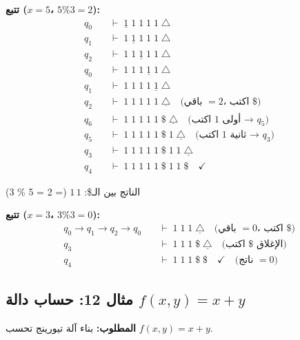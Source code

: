 \documentclass[14pt]{extarticle}
\begin{document}
\textbf{تتبع ($x = 5$، $5 \% 3 = 2$):}
\begin{align*}
q_0 \quad &\vdash \; \underline{1} \; 1 \; 1 \; 1 \; 1 \; \triangle \\
q_1 \quad &\vdash \; 1 \; \underline{1} \; 1 \; 1 \; 1 \; \triangle \\
q_2 \quad &\vdash \; 1 \; 1 \; \underline{1} \; 1 \; 1 \; \triangle \\
q_0 \quad &\vdash \; 1 \; 1 \; 1 \; \underline{1} \; 1 \; \triangle \\
q_1 \quad &\vdash \; 1 \; 1 \; 1 \; 1 \; \underline{1} \; \triangle \\
q_2 \quad &\vdash \; 1 \; 1 \; 1 \; 1 \; 1 \; \underline{\triangle} \quad \text{(باقي $= 2$، اكتب $\$$)} \\
q_6 \quad &\vdash \; 1 \; 1 \; 1 \; 1 \; 1 \; \$ \; \underline{\triangle} \quad \text{(اكتب $1$ أولى → $q_5$)} \\
q_5 \quad &\vdash \; 1 \; 1 \; 1 \; 1 \; 1 \; \$ \; 1 \; \underline{\triangle} \quad \text{(اكتب $1$ ثانية → $q_3$)} \\
q_3 \quad &\vdash \; 1 \; 1 \; 1 \; 1 \; 1 \; \$ \; 1 \; 1 \; \underline{\triangle} \\
q_4 \quad &\vdash \; 1 \; 1 \; 1 \; 1 \; 1 \; \$ \; 1 \; 1 \; \$ \quad \checkmark
\end{align*}

الناتج بين الـ\$: $1\,1$ (= 2 = 5 \% 3) \checkmark

\textbf{تتبع ($x = 3$، $3 \% 3 = 0$):}
\begin{align*}
q_0 \to q_1 \to q_2 \to q_0 \quad &\vdash \; 1 \; 1 \; 1 \; \underline{\triangle} \quad \text{(باقي $= 0$، اكتب $\$$)} \\
q_3 \quad &\vdash \; 1 \; 1 \; 1 \; \$ \; \underline{\triangle} \quad \text{(اكتب $\$$ الإغلاق)} \\
q_4 \quad &\vdash \; 1 \; 1 \; 1 \; \$ \; \$ \quad \checkmark \quad \text{(ناتج $= 0$)}
\end{align*}

\clearpage


\subsection{مثال 12: حساب دالة $f(x,y) = x + y$}

\textbf{المطلوب:} بناء آلة تيورينج تحسب $f(x, y) = x + y$.
\end{document}

